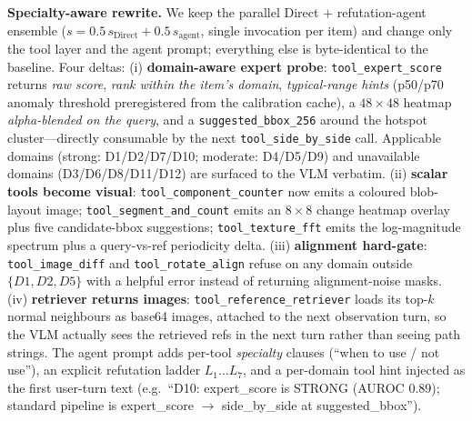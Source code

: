 \textbf{Specialty-aware rewrite.} We keep the parallel Direct $+$
refutation-agent ensemble
($s = 0.5\,s_{\mathrm{Direct}}+0.5\,s_{\mathrm{agent}}$, single invocation per
item) and change only the tool layer and the agent prompt; everything
else is byte-identical to the baseline. Four deltas:
(i) \textbf{domain-aware expert probe}: \texttt{tool\_expert\_score}
returns \emph{raw score}, \emph{rank within the item's domain},
\emph{typical-range hints} (p50/p70 anomaly threshold preregistered from
the calibration cache), a $48\!\times\!48$ heatmap \emph{alpha-blended on
the query}, and a \texttt{suggested\_bbox\_256} around the hotspot
cluster---directly consumable by the next \texttt{tool\_side\_by\_side} call.
Applicable domains (strong: D1/D2/D7/D10; moderate: D4/D5/D9) and
unavailable domains (D3/D6/D8/D11/D12) are surfaced to the VLM verbatim.
(ii) \textbf{scalar tools become visual}: \texttt{tool\_component\_counter}
now emits a coloured blob-layout image; \texttt{tool\_segment\_and\_count}
emits an $8\!\times\!8$ change heatmap overlay plus five candidate-bbox
suggestions; \texttt{tool\_texture\_fft} emits the log-magnitude spectrum
plus a query-vs-ref periodicity delta.
(iii) \textbf{alignment hard-gate}: \texttt{tool\_image\_diff} and
\texttt{tool\_rotate\_align} refuse on any domain outside $\{D1, D2, D5\}$
with a helpful error instead of returning alignment-noise masks.
(iv) \textbf{retriever returns images}: \texttt{tool\_reference\_retriever}
loads its top-$k$ normal neighbours as base64 images, attached to the next
observation turn, so the VLM actually sees the retrieved refs in the next
turn rather than seeing path strings.
The agent prompt adds per-tool \emph{specialty} clauses (``when to use /
not use''), an explicit refutation ladder $L_1\dots L_7$, and a per-domain
tool hint injected as the first user-turn text (e.g.\ ``D10: expert\_score
is STRONG (AUROC 0.89); standard pipeline is expert\_score $\to$ side\_by\_side
at suggested\_bbox'').

